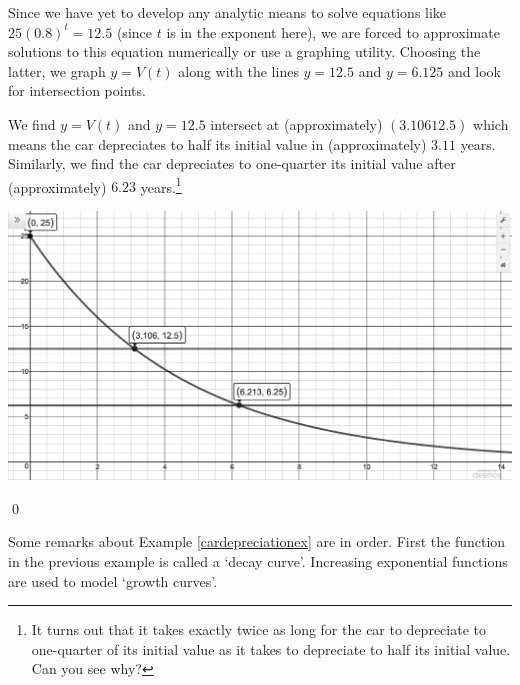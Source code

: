 \begin{ex}
\begin{enumerate}
\smallskip

Since we have yet to develop any analytic means to solve equations like $25(0.8)^t = 12.5$ (since $t$ is in the exponent here), we are forced to approximate solutions to this equation numerically or use a graphing utility.  Choosing the latter, we graph $y = V(t)$ along with the lines $y = 12.5$ and $y = 6.125$ and look for intersection points.  

\smallskip

We find $y = V(t)$ and $y = 12.5$ intersect at (approximately) $(3.106 12.5)$ which means the car depreciates to half its initial value in (approximately) $3.11$ years.  Similarly, we find the car depreciates to one-quarter its initial value after (approximately) $6.23$ years.\footnote{It turns out that it takes exactly twice as long for the car to depreciate to one-quarter of its initial value as it takes to depreciate to half its initial value. Can you see why?}

\begin{center}

\includegraphics[width=6in]{./ExponentialFunctionsGraphics/ExponentialFunctionsEx01.jpg}

\end{center}

\qed
 
\end{enumerate}

\end{ex}

Some remarks about Example \ref{cardepreciationex} are in order.  First the function in the previous example is  called a `decay curve'.  Increasing exponential functions are used to model `growth curves'.  

